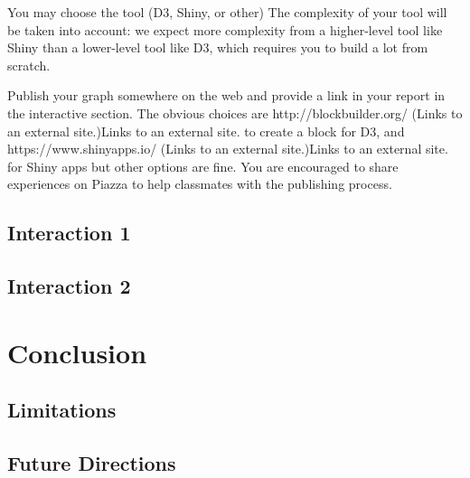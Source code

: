 \documentclass[11pt,fleqn]{book} %
\begin{document}
You may choose the tool (D3, Shiny, or other) The complexity of your tool will be taken into account: we expect more complexity from a higher-level tool like Shiny than a lower-level tool like D3, which requires you to build a lot from scratch.   

Publish your graph somewhere on the web and provide a link in your report in the interactive section. The obvious choices are http://blockbuilder.org/ (Links to an external site.)Links to an external site. to create a block for D3, and https://www.shinyapps.io/ (Links to an external site.)Links to an external site. for Shiny apps but other options are fine. You are encouraged to share experiences on Piazza to help classmates with the publishing process.

\section{Interaction 1}

\vspace{1em}


\section{Interaction 2}

\vspace{1em}




\chapter{Conclusion}

\section{Limitations}

\vspace{1em}

\section{Future Directions}
\end{document}
